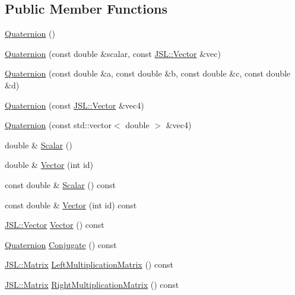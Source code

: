 \subsection*{Public Member Functions}
\begin{DoxyCompactItemize}
\item 
\hyperlink{classJSL_1_1Quaternion_a3bfe577832b38cdf2dbbb143c9487add}{Quaternion} ()
\item 
\hyperlink{classJSL_1_1Quaternion_ae31be96e94176f1e5278cfaeba39dedc}{Quaternion} (const double \&scalar, const \hyperlink{classJSL_1_1Vector}{J\+S\+L\+::\+Vector} \&vec)
\item 
\hyperlink{classJSL_1_1Quaternion_ac0fa428adfcbc3db2eff9b5c86e7a075}{Quaternion} (const double \&a, const double \&b, const double \&c, const double \&d)
\item 
\hyperlink{classJSL_1_1Quaternion_a6b71605f5fafada8e94bab1bf9af55bd}{Quaternion} (const \hyperlink{classJSL_1_1Vector}{J\+S\+L\+::\+Vector} \&vec4)
\item 
\hyperlink{classJSL_1_1Quaternion_a738b4fb82caf2a0334818ac4e6c494de}{Quaternion} (const std\+::vector$<$ double $>$ \&vec4)
\item 
double \& \hyperlink{classJSL_1_1Quaternion_a67d6b60a4863985f94d23c68953dcd91}{Scalar} ()
\item 
double \& \hyperlink{classJSL_1_1Quaternion_a92b7311aecae986edb373e0b40d5bfdd}{Vector} (int id)
\item 
const double \& \hyperlink{classJSL_1_1Quaternion_aba8a8ac1d2101f8b374387349412035b}{Scalar} () const
\item 
const double \& \hyperlink{classJSL_1_1Quaternion_a5243fa5db9d466bf1485a83325a682b0}{Vector} (int id) const
\item 
\hyperlink{classJSL_1_1Vector}{J\+S\+L\+::\+Vector} \hyperlink{classJSL_1_1Quaternion_a0255f2026ec4af9cff42d09d2309af01}{Vector} () const
\item 
\hyperlink{classJSL_1_1Quaternion}{Quaternion} \hyperlink{classJSL_1_1Quaternion_a9bea717f4cd1b5d4e3bdb8eedfbaed2c}{Conjugate} () const
\item 
\hyperlink{classJSL_1_1Matrix}{J\+S\+L\+::\+Matrix} \hyperlink{classJSL_1_1Quaternion_ada6a7067e13b60a65a6103f7508f62f3}{Left\+Multiplication\+Matrix} () const
\item 
\hyperlink{classJSL_1_1Matrix}{J\+S\+L\+::\+Matrix} \hyperlink{classJSL_1_1Quaternion_a081b38fc741f2dc9d4f2b955acbed833}{Right\+Multiplication\+Matrix} () const
\end{DoxyCompactItemize}
